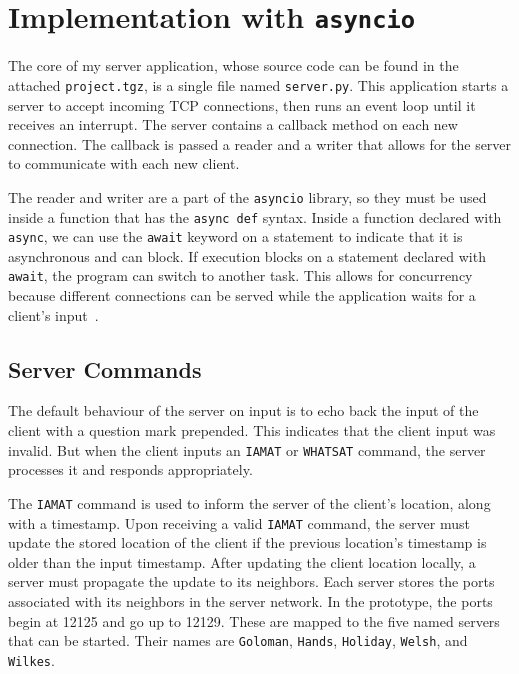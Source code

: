 \documentclass[letterpaper,twocolumn,10pt]{article}
\begin{document}
\section{Implementation with \texttt{asyncio}}

The core of my server application, whose source code can be found in the attached \texttt{project.tgz}, is a single
file named \texttt{server.py}. This application starts a server to accept incoming TCP connections, then runs an event loop
until it receives an interrupt. The server contains a callback method on each new connection. The callback is passed
a reader and a writer that allows for the server to communicate with each new client.

The reader and writer are a part of the \texttt{asyncio} library, so they must be used inside a function that has
the \texttt{async def} syntax. Inside a function declared with \texttt{async}, we can use the \texttt{await} keyword
on a statement to indicate that it is asynchronous and can block. If execution blocks on a statement declared with
\texttt{await}, the program can switch to another task. This allows for concurrency because different connections
can be served while the application waits for a client's input~\cite{asynciodocs}.

\subsection{Server Commands}

The default behaviour of the server on input is to echo back the input of the client with a question mark prepended.
This indicates that the client input was invalid. But when the client inputs an \texttt{IAMAT} or \texttt{WHATSAT} command,
the server processes it and responds appropriately.

The \texttt{IAMAT} command is used to inform the server of the client's location, along with a timestamp. Upon receiving
a valid \texttt{IAMAT} command, the server must update the stored location of the client if the previous location's timestamp
is older than the input timestamp. After updating the client location locally, a server must propagate the update to its
neighbors. Each server stores the ports associated with its neighbors in the server network. In the prototype, the ports begin
at 12125 and go up to 12129. These are mapped to the five named servers that can be started. Their names are \texttt{Goloman},
\texttt{Hands}, \texttt{Holiday}, \texttt{Welsh}, and \texttt{Wilkes}.
\end{document}
